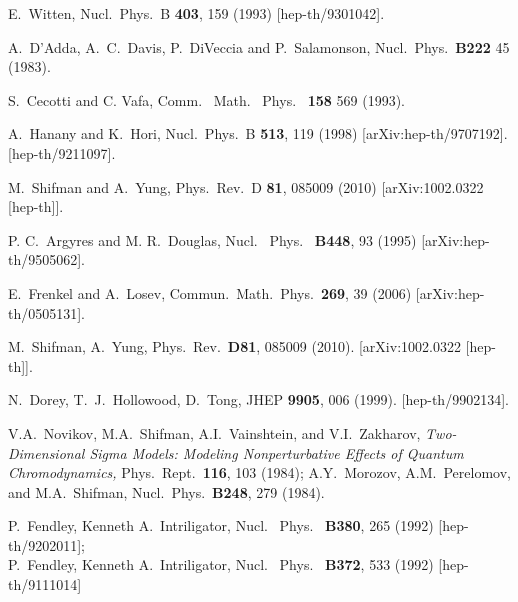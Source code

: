 \documentclass[epsfig,12pt]{article}
\newcommand{\ntwo}{${\mathcal N}=2\;$}
\begin{document}
\begin{thebibliography}{99}
E.~Witten,
  Nucl.\ Phys.\ B {\bf 403}, 159 (1993)
  [hep-th/9301042].

A.~D'Adda, A.~C.~Davis, P.~DiVeccia and P.~Salamonson,
Nucl.\ Phys.\ {\bf B222} 45 (1983).
   
S.~Cecotti and C. Vafa,
Comm. \ Math. \ Phys. \ {\bf 158} 569 (1993).

A.~Hanany and K.~Hori,
  Nucl.\ Phys.\  B {\bf 513}, 119 (1998)
  [arXiv:hep-th/9707192].
[hep-th/9211097].

M.~Shifman and A.~Yung,
  Phys.\ Rev.\  D {\bf 81}, 085009 (2010)
  [arXiv:1002.0322 [hep-th]].

P. C.~Argyres and M. R.~Douglas,
Nucl. \ Phys. \ {\bf B448}, 93 (1995)   
[arXiv:hep-th/9505062].

  
E.~Frenkel and A.~Losev,
  Commun.\ Math.\ Phys.\  {\bf 269}, 39 (2006)
  [arXiv:hep-th/0505131].
  
  M.~Shifman, A.~Yung,
  Phys.\ Rev.\  {\bf D81}, 085009 (2010).
  [arXiv:1002.0322 [hep-th]].

  N.~Dorey, T.~J.~Hollowood, D.~Tong,
  JHEP {\bf 9905}, 006 (1999).
  [hep-th/9902134].

  V.A.~Novikov, M.A.~Shifman, A.I.~Vainshtein, and V.I.~Zakharov,
 {\em Two-Dimensional Sigma Models: Modeling Nonperturbative Effects of Quantum Chromodynamics,}
  Phys.\ Rept.\  {\bf 116}, 103 (1984);  A.Y.~Morozov, A.M.~Perelomov, and M.A.~Shifman,
  Nucl.\ Phys.\  {\bf B248}, 279 (1984).
  
P.~Fendley, Kenneth A.~Intriligator, 
Nucl. \ Phys. \ {\bf B380}, 265 (1992) 
[hep-th/9202011];\\
P.~Fendley, Kenneth A.~Intriligator, 
Nucl. \ Phys. \ {\bf B372}, 533 (1992) 
[hep-th/9111014]

\end{thebibliography}
\end{document}
